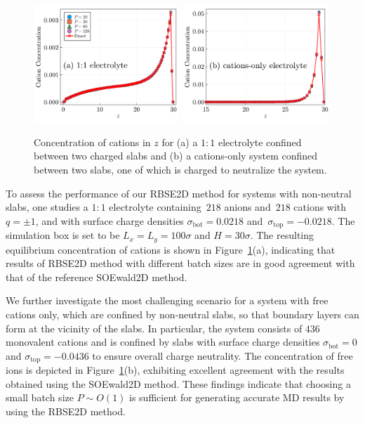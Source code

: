 \begin{figure}[ht]
	\centering
	\includegraphics[width=0.49\textwidth]{figs/hist_Ez.pdf} 
	\includegraphics[width=0.49\textwidth]{figs/hist_cation.pdf}
	\caption{
		Concentration of cations in $z$ for (a) a $1:1$ electrolyte confined between two charged slabs and (b) a cations-only system confined between two slabs, one of which is charged to neutralize the system. 
	}
	\label{fig:Ez_density}
\end{figure}


To assess the performance of our RBSE2D method for systems with non-neutral slabs, one studies
a $1:1$ electrolyte containing~$218$ anions and~$218$ cations with~$q = \pm 1$, and with surface charge densities $\sigma_{\mathrm{bot}}=0.0218$ and~$\sigma_{\mathrm{top}}=-0.0218$. The simulation box is set to be $L_x = L_y = 100 \sigma$ and $H = 30 \sigma$.
The resulting equilibrium concentration of cations is shown in Figure~\ref{fig:Ez_density}(a), indicating that results of RBSE2D method with different batch sizes are in good agreement with that of the reference SOEwald2D method. 

We further investigate the most challenging scenario for a system with free cations only, which are confined by non-neutral slabs, so that boundary layers can form at the vicinity of the slabs. 
In particular, the system consists of $436$ monovalent cations and is confined by slabs with surface charge densities $\sigma_{\mathrm{bot}}=0$ and $\sigma_{\mathrm{top}}=-0.0436$ to ensure overall charge neutrality. The concentration of free ions is depicted in Figure~\ref{fig:Ez_density}(b), exhibiting excellent agreement with the results obtained using the SOEwald2D method. 
These findings indicate that choosing a small batch size $P\sim O(1)$ is sufficient for generating accurate MD results by using the RBSE2D method.

